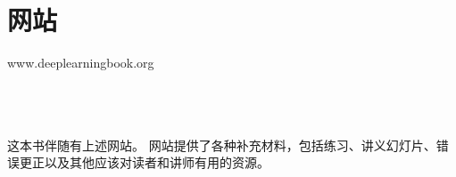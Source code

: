 \chapter*{网站}

\centerline{www.deeplearningbook.org}

\ \\
\ \\
\ \\

这本书伴随有上述网站。
网站提供了各种补充材料，包括练习、讲义幻灯片、错误更正以及其他应该对读者和讲师有用的资源。
